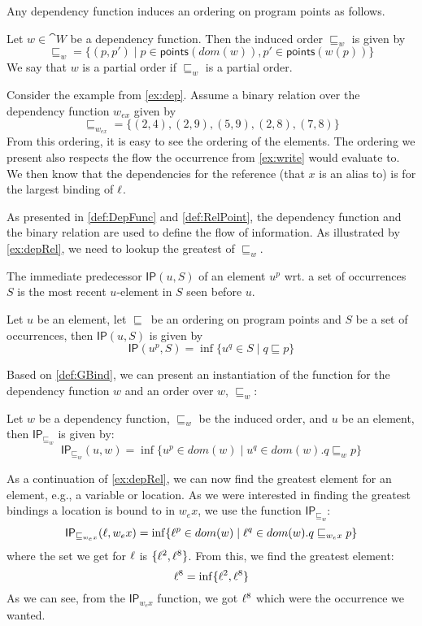 \documentclass{llncs}
\newcommand{\sqleq}{\ensuremath{\sqsubseteq\xspace}}
\newcommand{\points}{\ensuremath{\textsf{points}}}
\newcommand{\IP}{\ensuremath{\textsf{IP}}\xspace}
\begin{document}
Any dependency function induces an ordering on program points as follows.

\begin{definition}\label{def:RelPoint}
	Let $w\in\cat{W}$ be a dependency function.
	Then the induced order $\sqleq_w$ is given by
	 \[ \sqleq_w= \{(p,p')\mid p \in \points(dom(w)), p' \in
           \points(w(p)) \} \]
         	We say that $w$ is a partial order if $\sqleq_w$ is a partial order.
\end{definition}

\begin{example}\label{ex:depRel}
	Consider the example from \cref{ex:dep}. Assume a binary
        relation over the dependency function $w_{ex}$ given by
	\[ \sqleq_{w_{ex}}=\{(2,4),(2,9),(5,9),(2,8),(7,8)\} \]
	From this ordering, it is easy to see the ordering of the elements.
	The ordering we present also respects the flow the occurrence from \cref{ex:write} would evaluate to.
	We then know that the dependencies for the reference (that $x$ is an alias to) is for the largest binding of $\ell$.
\end{example}

As presented in \cref{def:DepFunc} and \cref{def:RelPoint}, the
dependency function and the binary relation are used to define the
flow of information. As illustrated by \cref{ex:depRel}, we need to
lookup the greatest of $\sqleq_w$. 

The immediate predecessor $\IP(u,S)$ of an element $u^p$ wrt. a set of
occurrences $S$ is the most recent $u$-element in $S$ seen before $u$. 

\begin{definition}\label{def:GBind}
  Let $u$ be an element, let \sqleq\ be an ordering on program points
  and $S$ be a set of occurrences, then $\IP(u,S)$ is given by
\[ \IP(u^p,S)=\inf\{u^q\in S\mid q\sqleq p\} \]
\end{definition}

Based on \cref{def:GBind}, we can present an instantiation of the
function for the dependency function $w$ and an order over $w$,
$\sqleq_w$: 

\begin{definition}
  Let $w$ be a dependency function, $\sqleq_w$ be the induced order,
  and $u$ be an element, then $\IP_{\sqleq_w}$ is given by:
	$$\IP_{\sqleq_w}(u,w)=\inf\{u^p\in dom(w)\mid u^q\in dom(w).q\sqleq_w p\}$$
\end{definition}


\begin{example}\label{ex:deplookup}
  As a continuation of \cref{ex:depRel}, we can now find the greatest
  element for an element, e.g., a variable or location.  As we were
  interested in finding the greatest bindings a location is bound to
  in $w_ex$, we use the function $\IP_{\sqleq_w}$:
	\[ \IP_{\sqleq_{w_ex}}(\loc,w_ex)=\inf\{\loc^p\in dom(w)\mid
          \loc^q\in dom(w). q\sqleq_{w_ex} p\} \]
where the set we get for $\ell$ is 
$\{\ell^2,\ell^8\}$. From this, we find the greatest element: 
	\[ \ell^8=\inf\{\ell^2,\ell^8\} \]
	As we can see, from the $\IP_{w_ex}$ function, we got $\ell^8$ which were the occurrence we wanted.
\end{example}
\end{document}
